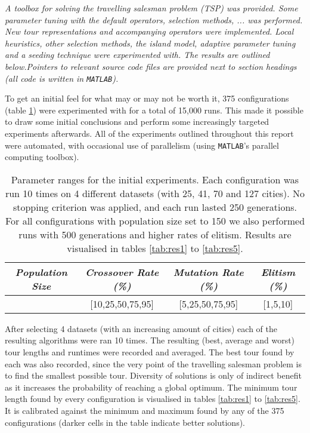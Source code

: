 
\begin{center}
\textit{A toolbox for solving the travelling salesman problem (TSP) was provided. Some parameter tuning with the default operators, selection methods, ... was performed. New tour representations and accompanying operators were implemented. Local heuristics, other selection methods, the island model, adaptive parameter tuning and a seeding technique were experimented with. The results are outlined below.Pointers to relevant source code files are provided next to section headings (all code is written in \texttt{MATLAB}).}
\end{center}


To get an initial feel for what may or may not be worth it, 375 configurations (table \ref{tab:par1}) were experimented with for a total of 15,000 runs. This made it possible to draw some initial conclusions and perform some increasingly targeted experiments afterwards. All of the experiments outlined throughout this report were automated, with occasional use of parallelism (using \texttt{MATLAB}'s parallel computing toolbox).

\begin{table}[h]
\centering
\begin{tabular}{c|c|c|c}
\textit{Population Size} & \textit{Crossover Rate (\%)} & \textit{Mutation Rate (\%)} & \textit{Elitism (\%)} \\\hline 
[150,300,600] & [10,25,50,75,95] & [5,25,50,75,95] & [1,5,10]
\end{tabular}
\caption{Parameter ranges for the initial experiments. Each configuration was run 10 times on 4 different datasets (with 25, 41, 70 and 127 cities). No stopping criterion was applied, and each run lasted 250 generations. For all configurations with population size set to 150 we also performed runs with 500 generations and higher rates of elitism. Results are visualised in tables \ref{tab:res1} to \ref{tab:res5}.}
\label{tab:par1}
\end{table}

\noindent After selecting 4 datasets (with an increasing amount of cities) each of the resulting algorithms were ran 10 times. The resulting (best, average and worst) tour lengths and runtimes were recorded and averaged. The best tour found by each was also recorded, since the very point of the travelling salesman problem is to find the smallest possible tour. Diversity of solutions is only of indirect benefit as it increases the probability of reaching a global optimum. The minimum tour length found by every configuration is visualised in tables \ref{tab:res1} to \ref{tab:res5}. It is calibrated against the minimum and maximum found by any of the 375 configurations (darker cells in the table indicate better solutions).\\

